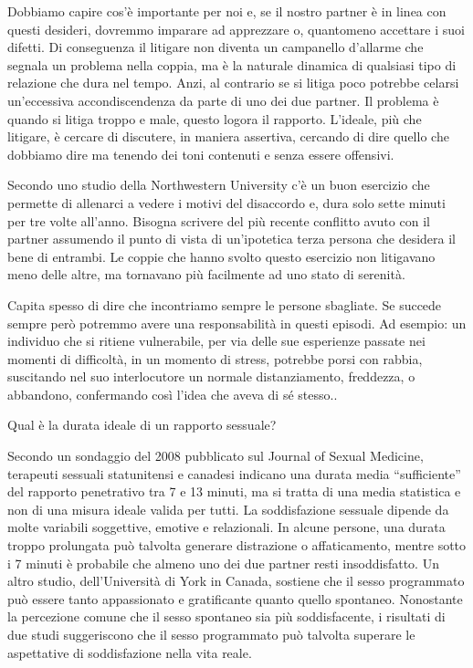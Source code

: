 \documentclass[12pt]{book} %
\begin{document}
Dobbiamo capire cos'è importante per noi e, se il nostro partner è in linea con questi desideri, dovremmo imparare ad apprezzare o, quantomeno accettare i suoi
difetti. Di conseguenza il litigare non diventa un campanello d'allarme che segnala un problema
nella coppia, ma è la naturale dinamica di qualsiasi tipo di relazione che dura nel tempo. Anzi, al contrario se si
litiga poco potrebbe celarsi un'eccessiva accondiscendenza da parte di uno dei due partner. Il
problema è quando si litiga troppo e male, questo logora il rapporto.
L'ideale, più che litigare, è cercare di discutere, in maniera assertiva, cercando di dire quello che dobbiamo dire ma tenendo dei toni contenuti e senza essere offensivi.

Secondo uno studio della Northwestern University c'è un buon esercizio che permette di allenarci a vedere i motivi del
disaccordo e, dura solo sette minuti per tre volte all'anno. Bisogna scrivere del più recente
conflitto avuto con il partner assumendo il punto di vista di un'ipotetica terza persona che desidera il bene di
entrambi. Le coppie che hanno svolto questo esercizio non litigavano meno delle altre, ma tornavano più facilmente ad
uno stato di serenità.

Capita spesso di dire che incontriamo sempre le persone sbagliate. Se succede sempre però potremmo avere una responsabilità in questi episodi. 
Ad esempio: un individuo che si ritiene vulnerabile, per via delle sue esperienze passate nei
momenti di difficoltà, in un momento di stress, potrebbe porsi con rabbia, suscitando nel suo interlocutore un normale
distanziamento, freddezza, o abbandono, confermando così l'idea che aveva di sé stesso..

\begin{mdframed}[linewidth=1pt]
Qual è la durata ideale di un rapporto sessuale?

Secondo un sondaggio del 2008 pubblicato sul Journal of Sexual Medicine, terapeuti sessuali statunitensi e canadesi indicano una durata media “sufficiente” del rapporto penetrativo tra 7 e 13 minuti, ma si tratta di una media statistica e non di una misura ideale valida per tutti. La soddisfazione sessuale dipende da molte variabili soggettive, emotive e relazionali. In alcune persone, una durata troppo prolungata può talvolta generare distrazione o affaticamento, mentre sotto i 7 minuti è probabile che almeno uno dei due partner resti insoddisfatto.
Un altro studio, dell’Università di York in Canada, sostiene che il sesso programmato può essere tanto appassionato e gratificante quanto quello spontaneo. Nonostante la percezione comune che il sesso spontaneo sia più soddisfacente, i risultati di due studi suggeriscono che il sesso programmato può talvolta superare le aspettative di soddisfazione nella vita reale.
\end{mdframed}
\end{document}
